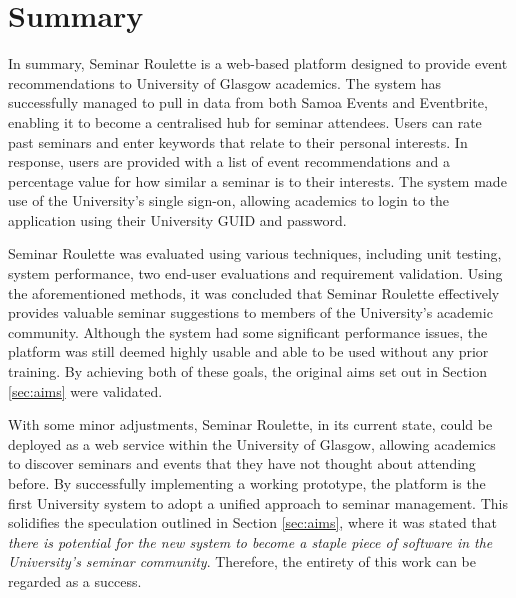 \documentclass{l4proj}
\begin{document}
\section{Summary}
\label{section:summary}

In summary, Seminar Roulette is a web-based platform designed to provide event recommendations to University of Glasgow academics. The system has successfully managed to pull in data from both Samoa Events and Eventbrite, enabling it to become a centralised hub for seminar attendees. Users can rate past seminars and enter keywords that relate to their personal interests. In response, users are provided with a list of event recommendations and a percentage value for how similar a seminar is to their interests. The system made use of the University's single sign-on, allowing academics to login to the application using their University GUID and password.

Seminar Roulette was evaluated using various techniques, including unit testing, system performance, two end-user evaluations and requirement validation. Using the aforementioned methods, it was concluded that Seminar Roulette effectively provides valuable seminar suggestions to members of the University's academic community. Although the system had some significant performance issues, the platform was still deemed highly usable and able to be used without any prior training. By achieving both of these goals, the original aims set out in Section \ref{sec:aims} were validated.

With some minor adjustments, Seminar Roulette, in its current state, could be deployed as a web service within the University of Glasgow, allowing academics to discover seminars and events that they have not thought about attending before. By successfully implementing a working prototype, the platform is the first University system to adopt a unified approach to seminar management. This solidifies the speculation outlined in Section \ref{sec:aims}, where it was stated that \emph{there is potential for the new system to become a staple piece of software in the University's seminar community}. Therefore, the entirety of this work can be regarded as a success.

%
% 
\end{document}
